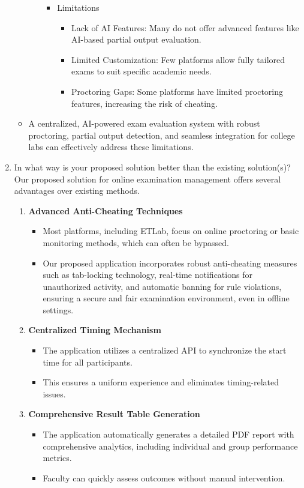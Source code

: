 \documentclass[14pt]{article}
\begin{document}
\begin{enumerate}
\begin{itemize}
\begin{enumerate}
\begin{itemize}
\item {Limitations}
\begin{itemize}
\item Lack of AI Features: Many do not offer advanced features like AI-based partial output evaluation.  
\item Limited Customization: Few platforms allow fully tailored exams to suit specific academic needs.  
\item Proctoring Gaps: Some platforms have limited proctoring features, increasing the risk of cheating.  
\end{itemize}
\end{itemize}
\end{enumerate}
\item A centralized, AI-powered exam evaluation system with robust proctoring, partial output detection, and seamless integration for college labs can effectively address these limitations.
\end{itemize}


\item In what way is your proposed solution better than the existing solution(s)?\\
\tabto{.5cm}Our proposed solution for online examination management offers several advantages over existing methods.
\begin{enumerate}
\item \textbf{Advanced Anti-Cheating Techniques}
\begin{itemize}
\item Most platforms, including ETLab, focus on online proctoring or basic monitoring methods, which can often be bypassed.
\item Our proposed application incorporates robust anti-cheating measures such as tab-locking technology, real-time notifications for unauthorized activity, and automatic banning for rule violations, ensuring a secure and fair examination environment, even in offline settings.
\end{itemize}

\item \textbf{Centralized Timing Mechanism}
\begin{itemize}
\item The application utilizes a centralized API to synchronize the start time for all participants.
\item This ensures a uniform experience and eliminates timing-related issues.
\end{itemize}

\item \textbf{Comprehensive Result Table Generation}
\begin{itemize}
\item The application automatically generates a detailed PDF report with comprehensive analytics, including individual and group performance metrics.
\item Faculty can quickly assess outcomes without manual intervention.
\end{itemize}


\end{enumerate}
\end{enumerate}
\end{document}
